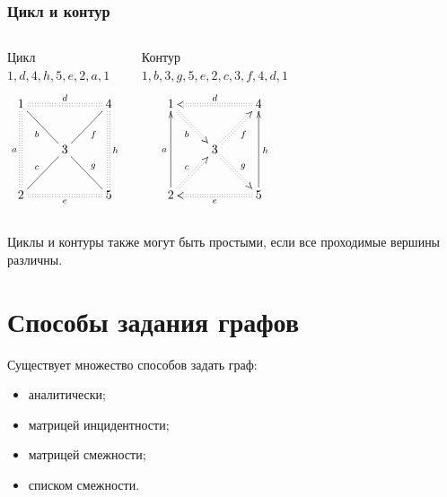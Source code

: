 \begin{frame}
    \frametitle{Цикл и контур}

    \begin{columns}
            \begin{block}{Цикл \\$1,d,4,h,5,e,2,a,1$}
                \[
                    {\xymatrix{
                        1 \ar@{:}[dd]_{a} \ar@{:}[rr]^{d} \ar@{-}[dr]_{b}
                            &*{}
                                &4 \ar@{:}[dd]^{h}
                                    \\
                        *{} 
                            &3 \ar@{-}[ur]_{f} \ar@{-}[dr]^{g}
                                &*{}
                                    \\
                        2  \ar@{-}[ur]^{c} \ar@{:}[rr]_{e}
                            &*{}
                                &5
                    }}
                \]
            \end{block}
        
            \begin{block}{Контур\\$1,b,3,g,5,e,2,c,3,f,4,d,1$}
                \[
                    {\xymatrix{
                        1 \ar@{<-}[dd]_{a} \ar@{<:}[rr]^{d} \ar@{:>}[dr]_{b}
                            &*{}
                                &4 \ar@{<-}[dd]^{h}
                                    \\
                        *{} 
                            &3 \ar@{:>}[ur]_{f} \ar@{:>}[dr]^{g}
                                &*{}
                                    \\
                        2  \ar@{:>}[ur]^{c} \ar@{<:}[rr]_{e}
                            &*{}
                                &5
                    }}
                \]
            \end{block}
    \end{columns}    
    Циклы и контуры также могут быть \alert{простыми}, если все проходимые вершины различны.
\end{frame}

\section{Способы задания графов}

Существует множество способов задать граф:
\begin{itemize}
    \item аналитически;
    \item матрицей инцидентности;
    \item матрицей смежности;
    \item списком смежности.
\end{itemize}

